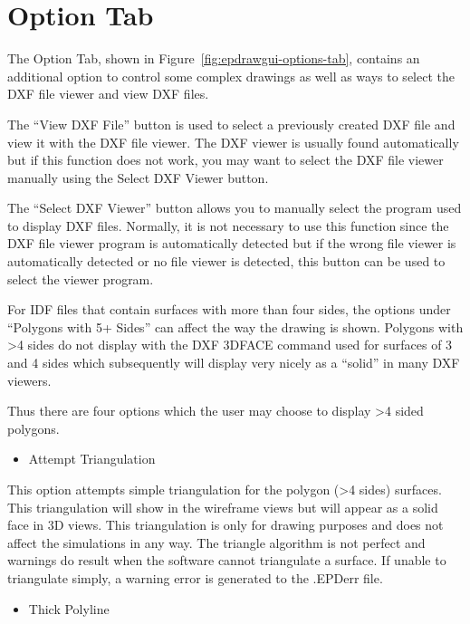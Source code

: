 \section{Option Tab}\label{option-tab}

The Option Tab, shown in Figure~\ref{fig:epdrawgui-options-tab}, contains an additional option to control some complex drawings as well as ways to select the DXF file viewer and view DXF files.

The ``View DXF File'' button is used to select a previously created DXF file and view it with the DXF file viewer. The DXF viewer is usually found automatically but if this function does not work, you may want to select the DXF file viewer manually using the Select DXF Viewer button.

The ``Select DXF Viewer'' button allows you to manually select the program used to display DXF files. Normally, it is not necessary to use this function since the DXF file viewer program is automatically detected but if the wrong file viewer is automatically detected or no file viewer is detected, this button can be used to select the viewer program.

For IDF files that contain surfaces with more than four sides, the options under ``Polygons with 5+ Sides'' can affect the way the drawing is shown. Polygons with \textgreater{}4 sides do not display with the DXF 3DFACE command used for surfaces of 3 and 4 sides which subsequently will display very nicely as a ``solid'' in many DXF viewers.

Thus there are four options which the user may choose to display \textgreater{}4 sided polygons.

\begin{itemize}
\tightlist
\item
  Attempt Triangulation
\end{itemize}

This option attempts simple triangulation for the polygon (\textgreater{}4 sides) surfaces. This triangulation will show in the wireframe views but will appear as a solid face in 3D views. This triangulation is only for drawing purposes and does not affect the simulations in any way. The triangle algorithm is not perfect and warnings do result when the software cannot triangulate a surface. If unable to triangulate simply, a warning error is generated to the .EPDerr file.

\begin{itemize}
\tightlist
\item
  Thick Polyline
\end{itemize}

